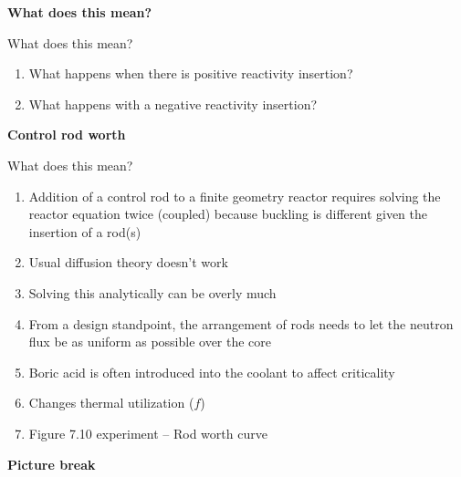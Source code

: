 \documentclass[aspectratio=1610,pdftex,dvipsnames,compress,xcolor={dvipsnames}]{beamer}
\begin{document}
\begin{frame}[plain]{}
    \centering\LARGE\textbf{What does this mean?}
\end{frame}


\addtocounter{framenumber}{-1} 
\begin{frame}{What does this mean?}
    \begin{enumerate}[series=outerlist,topsep=0pt,itemsep=21pt,leftmargin=*,label=(\arabic*)]
        \item[]What happens when there is positive reactivity insertion?
        \item[]What happens with a negative reactivity insertion?
    \end{enumerate}
\end{frame}


\begin{frame}[plain]{}
    \centering\LARGE\textbf{Control rod worth}
\end{frame}


\addtocounter{framenumber}{-1} 
\begin{frame}{What does this mean?}
    \begin{enumerate}[series=outerlist,topsep=0pt,itemsep=18pt,leftmargin=*,label=(\arabic*)]
        \item[]Addition of a control rod to a finite geometry reactor requires solving the reactor equation twice (coupled) because buckling is different given the insertion of a rod(s)
        \item[]Usual diffusion theory doesn't work
        \item[]Solving this analytically can be overly much
        \item[]From a design standpoint, the arrangement of rods needs to let the neutron flux be as uniform as possible over the core
        \item[]Boric acid is often introduced into the coolant to affect criticality
        \item[]Changes thermal utilization ($f$)
        \item[]Figure 7.10 experiment -- Rod worth curve
    \end{enumerate}
\end{frame}


\begin{frame}[plain]{}
    \centering\LARGE\textbf{Picture break}
\end{frame}
\end{document}
